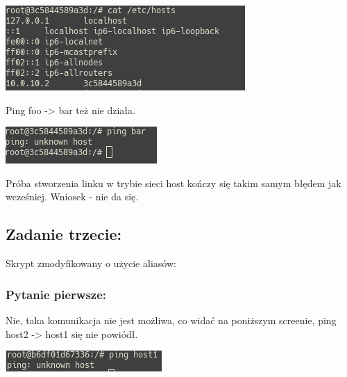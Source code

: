 \documentclass[12pt]{article}
\begin{document}
    \vspace{0.2cm}

    \includegraphics[width=\textwidth]{hostsfail.png}

    Ping foo -> bar też nie działa.

    \vspace{0.2cm}

    \includegraphics[width=\textwidth]{pingfail.png}

    Próba stworzenia linku w trybie sieci host kończy się takim samym błędem jak wcześniej. Wniosek - nie da się.

    \subsection{Zadanie trzecie:}

    Skrypt zmodyfikowany o użycie aliasów:

    

    \subsubsection{Pytanie pierwsze:}

    Nie, taka komunikacja nie jest możliwa, co widać na poniższym screenie, ping host2 -> host1 się nie powiódł.

    \vspace{0.2cm}

    \includegraphics[width=\textwidth]{aliaspingfail.png}
\end{document}
